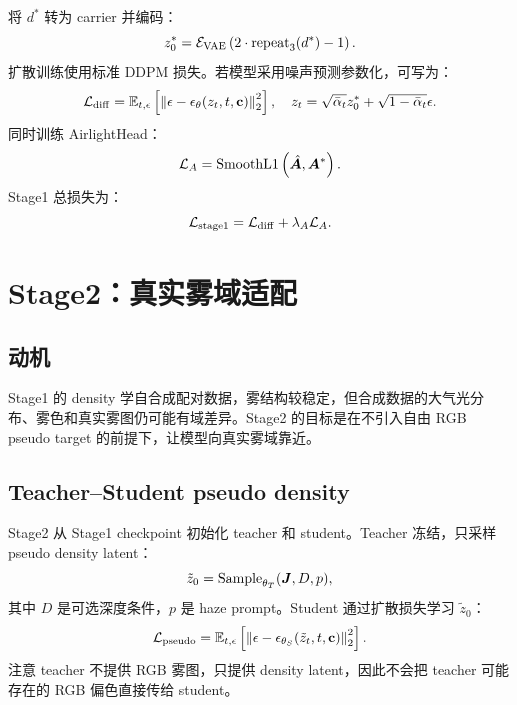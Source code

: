 \documentclass[11pt,a4paper]{ctexart}
\begin{document}
将 $d^*$ 转为 carrier 并编码：
\begin{equation}
  z_0^* = \mathcal{E}_{\rm VAE}\left(2\cdot{\rm repeat}_3(d^*)-1\right).
\end{equation}
扩散训练使用标准 DDPM 损失。若模型采用噪声预测参数化，可写为：
\begin{equation}
  \mathcal{L}_{\rm diff}
  =
  \mathbb{E}_{t,\epsilon}
  \left[
    \left\|
      \epsilon -
      \epsilon_{\theta}(z_t,t,\mathbf{c})
    \right\|_2^2
  \right],
  \quad
  z_t=\sqrt{\bar{\alpha}_t}z_0^*+\sqrt{1-\bar{\alpha}_t}\epsilon.
\end{equation}
同时训练 AirlightHead：
\begin{equation}
  \mathcal{L}_{A}
  =
  {\rm SmoothL1}\left(\hat{\bm{A}},\bm{A}^{*}\right).
\end{equation}
Stage1 总损失为：
\begin{equation}
  \mathcal{L}_{\rm stage1}
  =
  \mathcal{L}_{\rm diff}
  +
  \lambda_A\mathcal{L}_{A}.
  \label{eq:stage1_loss}
\end{equation}

\section{Stage2：真实雾域适配}

\subsection{动机}

Stage1 的 density 学自合成配对数据，雾结构较稳定，但合成数据的大气光分布、雾色和真实雾图仍可能有域差异。Stage2 的目标是在不引入自由 RGB pseudo target 的前提下，让模型向真实雾域靠近。

\subsection{Teacher--Student pseudo density}

Stage2 从 Stage1 checkpoint 初始化 teacher 和 student。Teacher 冻结，只采样 pseudo density latent：
\begin{equation}
  \tilde{z}_0 = {\rm Sample}_{\theta_T}(\bm{J},D,p),
\end{equation}
其中 $D$ 是可选深度条件，$p$ 是 haze prompt。Student 通过扩散损失学习 $\tilde{z}_0$：
\begin{equation}
  \mathcal{L}_{\rm pseudo}
  =
  \mathbb{E}_{t,\epsilon}
  \left[
    \left\|
      \epsilon -
      \epsilon_{\theta_S}(\tilde{z}_t,t,\mathbf{c})
    \right\|_2^2
  \right].
\end{equation}
注意 teacher 不提供 RGB 雾图，只提供 density latent，因此不会把 teacher 可能存在的 RGB 偏色直接传给 student。
\end{document}
